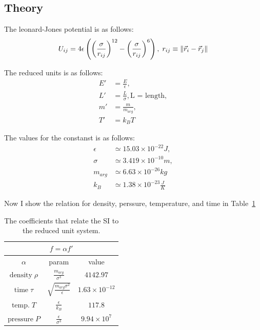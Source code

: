 \documentclass[12pt, a4paper]{article}
\begin{document}
	\subsection{Theory}
	The leonard-Jones potential is as follows:
		\begin{equation}
		U_{ij} = 4\epsilon \left(\left(\frac{\sigma}{r_{ij}}\right)^{12} - 
		\left(\frac{\sigma}{r_{ij}}\right)^6\right), \; 
		r_{ij} \equiv \norm{\vec{r}_i - \vec{r}_j}
		\label{eq:leonard_jones}
	\end{equation}
	
	The reduced units is as follows:
	\begin{equation}
		\begin{aligned}
			E' &= \frac{E}{\epsilon}, \\
			L' &= \frac{L}{\sigma}, \text{L = length},\\
			 m' &= \frac{m}{m_{arg}}, \\
			T' &= k_B T
		\end{aligned}
	\end{equation}
	
	The values for the constanst is as follows:
	\begin{equation}
		\begin{aligned}
			\epsilon &\simeq 15.03 \times 10^{-22} J,\\
			\sigma &\simeq 3.419 \times 10^{-10} m,\\
			m_{arg} &\simeq 6.63 \times 10^{-26} kg\\
			k_B &\simeq 1.38 \times 10^{-23} \frac{J}{K}
		\end{aligned}
	\end{equation}

	Now I show the relation for density, perssure, temperature, and time in Table~\ref{tab:reduced}
	
	\begin{table}[h!]
		\centering
		\begin{tabular}{|c|c|c|}
	\hline
\multicolumn{3}{|c|}{$f = \alpha f'$}\\
\hline
 $\alpha$ & param & value \\
 \hline
$\text{density} \;\rho$ & $\frac{m_{arg}}{\sigma^3}$ & $4142.97$\\
 \hline
 $\text{time}\; \tau$ & $\sqrt{\frac{m_{arg} \sigma^2}{\epsilon}}$ & $1.63 \times 10^{-12}$ \\
 \hline
$\text{temp.} \; T$ & $\frac{\epsilon}{k_B}$ & $117.8$\\
 \hline
 $\text{pressure}\; P$ & $\frac{\epsilon}{\sigma^3}$ & $9.94 \times 10^{7}$ \\	
 \hline
		\end{tabular}
	\caption{The coefficients that relate the SI to the reduced unit system. }
	\label{tab:reduced}
	\end{table}
	
\end{document}
